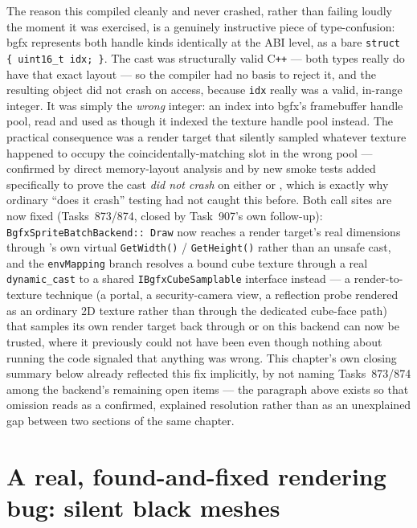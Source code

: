 The reason this compiled cleanly and never crashed, rather than failing loudly the moment it was
exercised, is a genuinely instructive piece of type-confusion: bgfx represents both handle kinds
identically at the ABI level, as a bare \texttt{struct \{ uint16\_t idx; \}}. The cast was
structurally valid C\texttt{++} --- both types really do have that exact layout --- so the
compiler had no basis to reject it, and the resulting object did not crash on access, because
\texttt{idx} really was a valid, in-range integer. It was simply the \emph{wrong} integer: an
index into bgfx's framebuffer handle pool, read and used as though it indexed the texture handle
pool instead. The practical consequence was a render target that silently sampled whatever
texture happened to occupy the coincidentally-matching slot in the wrong pool --- confirmed by
direct memory-layout analysis and by new smoke tests added specifically to prove the cast
\emph{did not crash} on either  or , which is
exactly why ordinary ``does it crash'' testing had not caught this before. Both call sites are
now fixed (Tasks~873/874, closed by Task~907's own follow-up): \texttt{BgfxSpriteBatchBackend::%
Draw} now reaches a render target's real dimensions through 's own
virtual \texttt{GetWidth()} / \texttt{GetHeight()} rather than an unsafe cast, and the
\texttt{envMapping} branch resolves a bound cube texture through a real \texttt{dynamic\_cast} to
a shared \texttt{IBgfxCubeSamplable} interface instead --- a render-to-texture technique (a
portal, a security-camera view, a reflection probe rendered as an ordinary 2D texture rather than
through the dedicated cube-face path) that samples its own render target back through
 or  on this backend can now be trusted,
where it previously could not have been even though nothing about running the code signaled that
anything was wrong. This chapter's own closing summary below already reflected this fix
implicitly, by not naming Tasks~873/874 among the backend's remaining open items --- the
paragraph above exists so that omission reads as a confirmed, explained resolution rather than
as an unexplained gap between two sections of the same chapter.

\section{A real, found-and-fixed rendering bug: silent black meshes}

